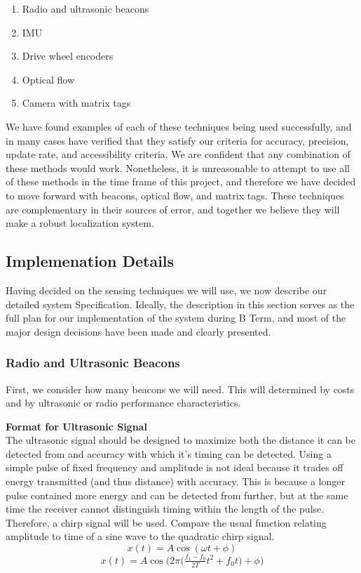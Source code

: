 \documentclass{article}
\begin{document}
\begin{enumerate}
    \item Radio and ultrasonic beacons
    \item IMU
    \item Drive wheel encoders
    \item Optical flow
    \item Camera with matrix tags
\end{enumerate}

We have found examples of each of these techniques being used successfully, and in many cases have verified that they satisfy our criteria for accuracy, precision, update rate, and accessibility criteria. We are confident that any combination of these methods would work. Nonetheless, it is unreasonable to attempt to use all of these methods in the time frame of this project, and therefore we have decided to move forward with beacons, optical flow, and matrix tags. These techniques are complementary in their sources of error, and together we believe they will make a robust localization system.

\subsection{Implemenation Details}
Having decided on the sensing techniques we will use, we now describe our detailed system Specification. Ideally, the description in this section serves as the full plan for our implementation of the system during B Term, and most of the major design decisions have been made and clearly presented.

\subsubsection{Radio and Ultrasonic Beacons}

First, we consider how many beacons we will need. This will determined by costs and by ultrasonic or radio performance characteristics.

\textbf{Format for Ultrasonic Signal} \\
The ultrasonic signal should be designed to maximize both the distance it can be detected from and accuracy with which it's timing can be detected. Using a simple pulse of fixed frequency and amplitude is not ideal because it trades off energy transmitted (and thus distance) with accuracy. This is because a longer pulse contained more energy and can be detected from further, but at the same time the receiver cannot distinguish timing within the length of the pulse. Therefore, a chirp signal will be used. Compare the usual function relating amplitude to time of a sine wave to the quadratic chirp signal.
$$ x(t) = A\cos(\omega t + \phi) $$
$$ x(t) = A\cos\bigg(2\pi\Big(\tfrac{f_1 - f_0}{2T}t^2+f_0t\Big) + \phi\bigg) $$
\end{document}
